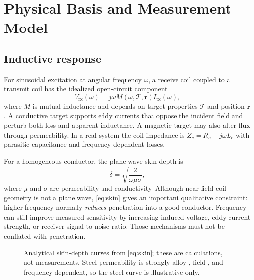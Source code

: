 \documentclass[10pt]{article}
\begin{document}
\section{Physical Basis and Measurement Model}
\subsection{Inductive response}
For sinusoidal excitation at angular frequency $\omega$, a receive coil coupled to a transmit coil has the idealized open-circuit component
\begin{equation}
V_{\mathrm{rx}}(\omega)=j\omega M(\omega,\mathcal{T},\mathbf{r})I_{\mathrm{tx}}(\omega),
\label{eq:mutual}
\end{equation}
where $M$ is mutual inductance and depends on target properties $\mathcal{T}$ and position $\mathbf{r}$. A conductive target supports eddy currents that oppose the incident field and perturb both loss and apparent inductance. A magnetic target may also alter flux through permeability. In a real system the coil impedance is $Z_c=R_c+j\omega L_c$ with parasitic capacitance and frequency-dependent losses.

For a homogeneous conductor, the plane-wave skin depth is
\begin{equation}
\delta=\sqrt{\frac{2}{\omega\mu\sigma}},
\label{eq:skin}
\end{equation}
where $\mu$ and $\sigma$ are permeability and conductivity. Although near-field coil geometry is not a plane wave, \cref{eq:skin} gives an important qualitative constraint: higher frequency normally \emph{reduces} penetration into a good conductor. Frequency can still improve measured sensitivity by increasing induced voltage, eddy-current strength, or receiver signal-to-noise ratio. Those mechanisms must not be conflated with penetration.

\begin{figure}[t]
\centering
{}
\caption{Analytical skin-depth curves from \cref{eq:skin}; these are calculations, not measurements. Steel permeability is strongly alloy-, field-, and frequency-dependent, so the steel curve is illustrative only.}
\label{fig:skin}
\end{figure}
\end{document}
